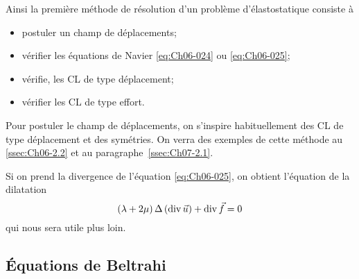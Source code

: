 Ainsi la première méthode de résolution d'un problème d'élastostatique consiste à 
\begin{itemize}
    \item postuler un champ de déplacements;
    \item vérifier les équations de Navier \eqref{eq:Ch06-024} ou \eqref{eq:Ch06-025};
    \item vérifie, les CL de type déplacement;
    \item vérifier les CL de type effort.
\end{itemize}
Pour postuler le champ de déplacements, on s'inspire habituellement des CL de type déplacement et des symétries.
On verra des exemples de cette méthode au \ref{ssec:Ch06-2.2} et au paragraphe~\ref{ssec:Ch07-2.1}. 

Si on prend la divergence de l'équation \eqref{eq:Ch06-025}, on obtient l'équation de la dilatation
\begin{equation}
    \left( \lambda + 2 \mu \right) \Delta \left( \operatorname*{\mathrm{div}} \vec{u} \right) + \operatorname*{\mathrm{div}} \vec{f} = 0
    \label{eq:Ch06-026}
\end{equation}
qui nous sera utile plus loin.

\subsection{Équations de Beltrahi}
\endinput
La seconde méthode de résolution consiste à postuler un champ de contraintes. La loi de comportement permet alors de calculer le champ des défotmations, mais pour pouvoir calculer le vecteur déplacement, il faut que Ce champ de déformations soit compatible (§ 111.3). Ainsi le champ de contraintes choisi doit vérifier les équations d'équilibre et un système d'équations traduisant les équations de compatibilité. Nous allons obtenir ce Système d'équations dans le cas statique et en élasticité classique et homOgène. 
Nous partons des équations de compatibilité sous la forme (111.60) et de la loi de comportement sous la forme (V.34). On obtient ainsi 
À -~y
(~G -" "~r" S . ) + <TU, ..
E Ai 
E .~ J~e E )..,~ 
.A +>! 2\l 
( ()iç.,:d.,+ ().<.~, i~ ) + -cru. .. = 0 
)J,o~
E E 
s..
(...J +v) O:t,~t -li O"H te ~a + <r~. .' 
) "'"', ""cl 
-(-1+"') [<Jit.,h + <T.i.,,-,i~ ] = o 
mais d'après les équations d'équilibre \eqref{eq:Ch06-001} 

et; 4'après la loi de comportement (V.34) et l'équation de la dila ta tion \eqref{eq:Ch06-026} 
E E 
= ­
(J.U.,U = éU,U t,À.
--l-~y (:;\ + ~t'")(-1-~)l) 

SOle finalement avec (V. 33) 

